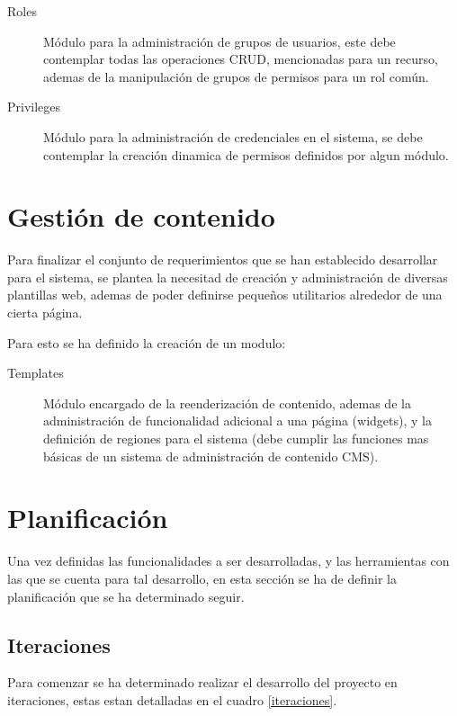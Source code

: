\begin{description}
\item [Roles] Módulo para la administración de grupos de usuarios, este debe
contemplar todas las operaciones CRUD, mencionadas para un recurso, ademas de la
manipulación de grupos de permisos para un rol común.
\item [Privileges] Módulo para la administración de credenciales en el sistema,
se debe contemplar la creación dinamica de permisos definidos por algun módulo.
\end{description}


\section{Gestión de contenido}

Para finalizar el conjunto de requerimientos que se han establecido desarrollar
para el sistema, se plantea la necesitad de creación y administración de
diversas plantillas web, ademas de poder definirse pequeños utilitarios
alrededor de una cierta página.

Para esto se ha definido la creación de un modulo:

\begin{description}
\item [Templates] Módulo encargado de la reenderización de contenido, ademas de
la administración de funcionalidad adicional a una página (widgets), y la
definición de regiones para el sistema (debe cumplir las funciones mas básicas
de un sistema de administración de contenido CMS).
\end{description}

\section{Planificación}

Una vez definidas las funcionalidades a ser desarrolladas, y las herramientas
con las que se cuenta para tal desarrollo, en esta sección se ha de definir la
planificación que se ha determinado seguir.

\subsection{Iteraciones}

Para comenzar se ha determinado realizar el desarrollo del proyecto en
iteraciones, estas estan detalladas en el cuadro \ref{iteraciones}.

